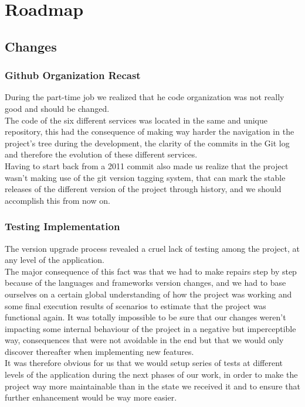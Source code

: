 \documentclass{eplmastersthesis}
\begin{document}
    \section{Roadmap}

      \subsection{Changes}

        \subsubsection{Github Organization Recast}

          During the part-time job we realized that he code organization
          was not really good and should be changed.\\
          The code of the six different services was located in the same and
          unique repository, this had the consequence of making way harder
          the navigation in the project's tree during the development, the
          clarity of the commits in the Git log and therefore the evolution
          of these different services.\\

          Having to start back from a 2011 commit also made us realize that the
          project wasn't making use of the git version tagging system, that
          can mark the stable releases of the different version of the project
          through history, and we should accomplish this from now on.

        \subsubsection{Testing Implementation}

          The version upgrade process revealed a cruel lack of testing among
          the project, at any level of the application.\\
          The major consequence of this fact was that we had to make repairs
          step by step because of the languages and frameworks version changes,
          and we had to base ourselves on a certain global understanding of how
          the project was working and some final execution results of scenarios
          to estimate that the project was functional again. It was totally
          impossible to be sure that our changes weren't impacting some internal
          behaviour of the project in a negative but imperceptible way,
          consequences that were not avoidable in the end but that we would
          only discover thereafter when implementing new features.\\
          It was therefore obvious for us that we would setup series of tests
          at different levels of the application during the next phases of our
          work, in order to make the project way more maintainable than in the
          state we received it and to ensure that further enhancement would
          be way more easier.
\end{document}
